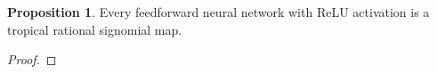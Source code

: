 \documentclass{article}
\theoremstyle{definition}
\newtheorem{lemma}[theorem]{Lemma}
\newtheorem{definition}[theorem]{Definition}
\newtheorem{proposition}[theorem]{Proposition}
\begin{document}
\begin{proposition}\cite{zhang2018tropical}
Every feedforward neural network with ReLU activation is a tropical rational signomial map.
\end{proposition}
\begin{proof}

\end{proof}

\newpage

%
\end{document}
